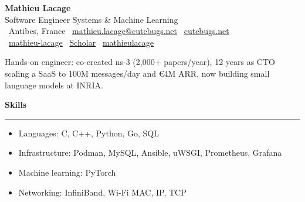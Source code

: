 \documentclass[a4paper,11pt]{article}
\newcommand{\styleRub}[1]{\needspace{6\baselineskip}\noindent\textbf{\large #1}\par\nopagebreak}
\newenvironment{sectionblock}[1]
{\styleRub{#1}\vspace{-0.6\baselineskip}\noindent\rule{\textwidth}{0.5mm}\par\nopagebreak
\begin{list}{}{\setlength{\leftmargin}{10pt}\setlength{\topsep}{0pt}}\item\relax}
{\end{list}}
\begin{document}
\begin{center}
{\LARGE\bfseries Mathieu Lacage}\\[0.3em]
{\large Software Engineer \textperiodcentered{} Systems \& Machine Learning}\\[0.3em]
\faMapMarker*\ Antibes, France \quad
\faEnvelope\ \href{mailto:mathieu.lacage@cutebugs.net}{mathieu.lacage@cutebugs.net} \quad
\faGlobe\ \href{https://www.cutebugs.net}{cutebugs.net}\\[0.2em]
\faGithub\ \href{https://github.com/mathieu-lacage/}{mathieu-lacage} \quad
\faGraduationCap\ \href{https://scholar.google.com/citations?user=xqmXrq0AAAAJ}{Scholar} \quad
\faLinkedin\ \href{https://www.linkedin.com/in/mathieulacage}{mathieulacage}
\end{center}

\begin{center}
Hands-on engineer: co-created ns-3 (2,000+ papers/year), 12 years as CTO
scaling a SaaS to 100M messages/day and €4M ARR, now building small language models at INRIA.
\end{center}

\vspace{0.45cm}
\begin{sectionblock}{Skills}

\begin{itemize}
\item Languages: C, C++, Python, Go, SQL
\item Infrastructure: Podman, MySQL, Ansible, uWSGI, Prometheus, Grafana
\item Machine learning: PyTorch
\item Networking: InfiniBand, Wi-Fi MAC, IP, TCP
\end{itemize}

\end{sectionblock}
\end{document}
